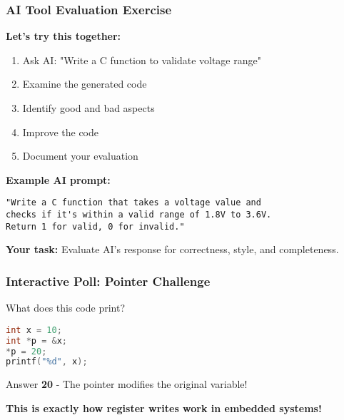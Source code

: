 \documentclass{beamer}
\begin{document}
\begin{frame}[fragile]
\frametitle{AI Tool Evaluation Exercise}
\textbf{Let's try this together:}

\begin{enumerate}
    \item Ask AI: "Write a C function to validate voltage range"
    \item Examine the generated code
    \item Identify good and bad aspects
    \item Improve the code
    \item Document your evaluation
\end{enumerate}

\vspace{0.5cm}
\textbf{Example AI prompt:}
\begin{verbatim}
"Write a C function that takes a voltage value and
checks if it's within a valid range of 1.8V to 3.6V.
Return 1 for valid, 0 for invalid."
\end{verbatim}

\vspace{0.5cm}
\textbf{Your task:} Evaluate AI's response for correctness, style, and completeness.
\end{frame}

\begin{frame}[fragile]
\frametitle{Interactive Poll: Pointer Challenge}
\begin{center}
\Large What does this code print?
\end{center}

\begin{lstlisting}[language=C]
int x = 10;
int *p = &x;
*p = 20;
printf("%d", x);
\end{lstlisting}

\pause

\begin{alertblock}{Answer}
\textbf{20} - The pointer modifies the original variable!
\end{alertblock}

\vspace{0.5cm}
\textbf{This is exactly how register writes work in embedded systems!}
\end{frame}
\end{document}
